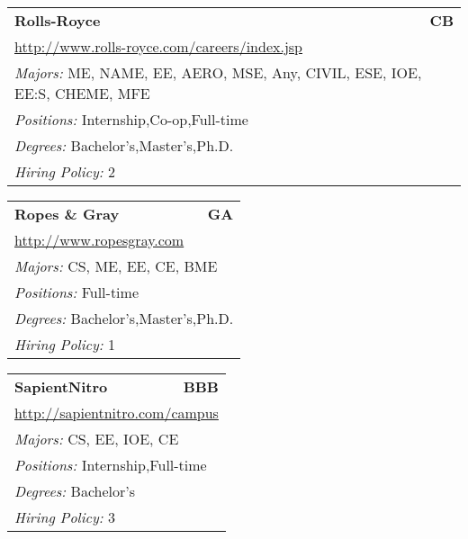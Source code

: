 \documentclass[twoside]{article}
\begin{document}
\begin{center}
\begin{multicols}{3}
\begin{FlushLeft}
\begin{minipage}{.9\columnwidth}
\end{minipage}
 
\begin{minipage}{.9\columnwidth}\begin{tabularx}{.95\columnwidth}{Xr}
                 {\Large\bf Rolls-Royce} & {\Large\bf CB}\\
    \multicolumn{2}{p{.95\columnwidth}}{\url{http://www.rolls-royce.com/careers/index.jsp}}\\
    \multicolumn{2}{p{.95\columnwidth}}{\emph{Majors:} ME, NAME, EE, AERO, MSE, Any, CIVIL, ESE, IOE, EE:S, CHEME, MFE}\\
    \multicolumn{2}{p{.95\columnwidth}}{\emph{Positions:} Internship,Co-op,Full-time}\\
    \multicolumn{2}{p{.95\columnwidth}}{\emph{Degrees:} Bachelor's,Master's,Ph.D.}\\
    \multicolumn{2}{p{.95\columnwidth}}{\emph{Hiring Policy:} 2}\\
    \end{tabularx}
    
\end{minipage}
 
\begin{minipage}{.9\columnwidth}\begin{tabularx}{.95\columnwidth}{Xr}
                 {\Large\bf Ropes \& Gray} & {\Large\bf GA}\\
    \multicolumn{2}{p{.95\columnwidth}}{\url{http://www.ropesgray.com}}\\
    \multicolumn{2}{p{.95\columnwidth}}{\emph{Majors:} CS, ME, EE, CE, BME}\\
    \multicolumn{2}{p{.95\columnwidth}}{\emph{Positions:} Full-time}\\
    \multicolumn{2}{p{.95\columnwidth}}{\emph{Degrees:} Bachelor's,Master's,Ph.D.}\\
    \multicolumn{2}{p{.95\columnwidth}}{\emph{Hiring Policy:} 1}\\
    \end{tabularx}
    
\end{minipage}
 
\begin{minipage}{.9\columnwidth}\begin{tabularx}{.95\columnwidth}{Xr}
                 {\Large\bf SapientNitro} & {\Large\bf BBB}\\
    \multicolumn{2}{p{.95\columnwidth}}{\url{http://sapientnitro.com/campus}}\\
    \multicolumn{2}{p{.95\columnwidth}}{\emph{Majors:} CS, EE, IOE, CE}\\
    \multicolumn{2}{p{.95\columnwidth}}{\emph{Positions:} Internship,Full-time}\\
    \multicolumn{2}{p{.95\columnwidth}}{\emph{Degrees:} Bachelor's}\\
    \multicolumn{2}{p{.95\columnwidth}}{\emph{Hiring Policy:} 3}\\
    \end{tabularx}
    

\end{minipage}
\end{FlushLeft}
\end{multicols}
\end{center}
\end{document}
